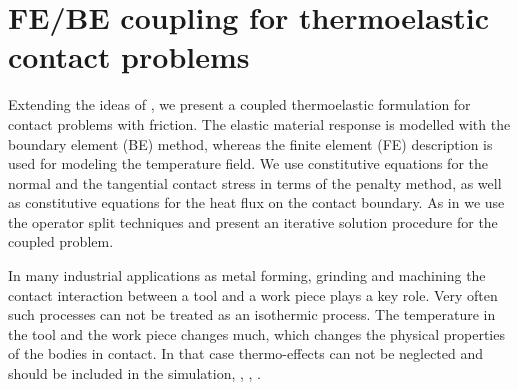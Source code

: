 \section{FE/BE coupling for thermoelastic contact problems}\label{sec:ThElContact}


Extending the ideas of \cite{WrMi94}, \cite{SiMi92} we present a coupled thermoelastic formulation for contact problems with friction. The elastic material response is modelled with the boundary element (BE) method, whereas the finite element (FE) description is used for modeling the temperature field. We use constitutive equations for the normal and the tangential contact stress in terms of the penalty method, as well as constitutive equations for the heat flux on the contact boundary. As in \cite{WrMi94} we use the operator split techniques and present an iterative solution procedure for the coupled problem.

In many industrial applications as metal forming, grinding and machining the contact interaction between a tool and a work piece plays a key role. Very often such processes can not be treated as an isothermic process. The temperature in the tool and the work piece changes much, which changes the physical properties of the bodies in contact. In that case thermo-effects can not be neglected and should be included in the simulation, \cite{JoKl93}, \cite{SiMi92}, \cite{WrMi94}.

